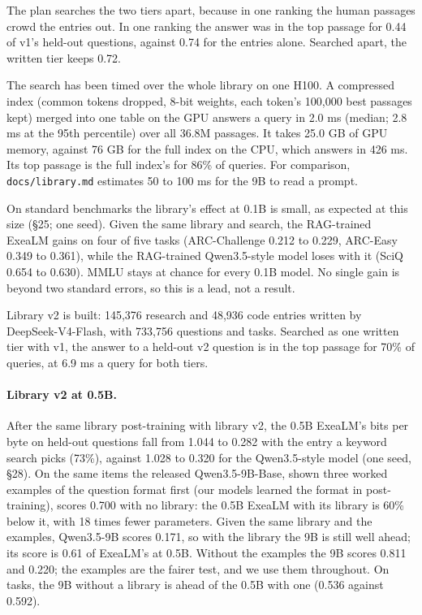 \documentclass[11pt,letterpaper]{article}
\newcommand{\sect}[1]{\S#1}
\begin{document}
The plan searches the two tiers apart, because in one ranking the human passages crowd the entries out.
In one ranking the answer was in the top passage for 0.44 of v1's held-out questions, against 0.74 for the entries alone. Searched apart, the written tier keeps 0.72.

The search has been timed over the whole library on one H100.
A compressed index (common tokens dropped, 8-bit weights, each token's 100,000 best passages kept) merged into one table on the GPU answers a query in 2.0 ms (median; 2.8 ms at the 95th percentile) over all 36.8M passages.
It takes 25.0 GB of GPU memory, against 76 GB for the full index on the CPU, which answers in 426 ms.
Its top passage is the full index's for 86\% of queries.
For comparison, \texttt{docs/library.md} estimates 50 to 100 ms for the 9B to read a prompt.

On standard benchmarks the library's effect at 0.1B is small, as expected at this size (\sect{25}; one seed).
Given the same library and search, the RAG-trained ExeaLM gains on four of five tasks (ARC-Challenge 0.212 to 0.229, ARC-Easy 0.349 to 0.361), while the RAG-trained Qwen3.5-style model loses with it (SciQ 0.654 to 0.630).
MMLU stays at chance for every 0.1B model.
No single gain is beyond two standard errors, so this is a lead, not a result.

Library v2 is built: 145,376 research and 48,936 code entries written by DeepSeek-V4-Flash, with 733,756 questions and tasks.
Searched as one written tier with v1, the answer to a held-out v2 question is in the top passage for 70\% of queries, at 6.9 ms a query for both tiers.

\paragraph{Library v2 at 0.5B.}
After the same library post-training with library v2, the 0.5B ExeaLM's bits per byte on held-out questions fall from 1.044 to 0.282 with the entry a keyword search picks (73\%), against 1.028 to 0.320 for the Qwen3.5-style model (one seed, \sect{28}).
On the same items the released Qwen3.5-9B-Base, shown three worked examples of the question format first (our models learned the format in post-training), scores 0.700 with no library: the 0.5B ExeaLM with its library is 60\% below it, with 18 times fewer parameters.
Given the same library and the examples, Qwen3.5-9B scores 0.171, so with the library the 9B is still well ahead; its score is 0.61 of ExeaLM's at 0.5B.
Without the examples the 9B scores 0.811 and 0.220; the examples are the fairer test, and we use them throughout.
On tasks, the 9B without a library is ahead of the 0.5B with one (0.536 against 0.592).
\end{document}
